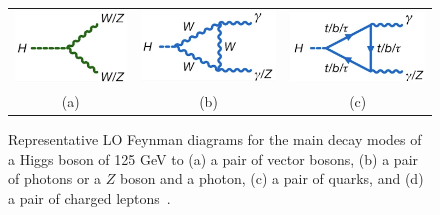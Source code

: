 \begin{figure}[htbp]
    \centering
    \begin{tabular}{ccc}
        \includegraphics[width=0.3\linewidth]{images/HVV.png}  &
        \includegraphics[width=0.3\linewidth]{images/Hgg.png}  &
        \includegraphics[width=0.3\linewidth]{images/Hgg_loop.png}   \\
        (a) & (b) & (c) \\
    \end{tabular}
    \vspace{0.5em} %
    \caption{
        Representative LO Feynman diagrams for the main decay modes of a Higgs boson of 125 GeV to (a) a pair of vector bosons, (b) a pair of photons or a $Z$ boson and a photon,
        (c) a pair of quarks, and (d) a pair of charged leptons~\cite{Nature_ATLAS}.}
    \label{fig:h_decays}
\end{figure}


